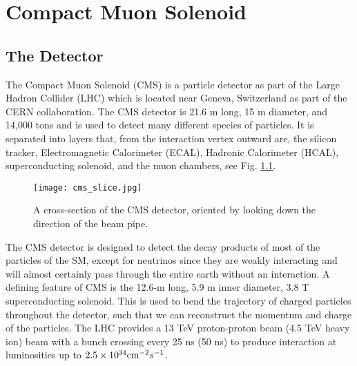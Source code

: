 \chapter{Compact Muon Solenoid}
\label{ch:CMS}

\section{The Detector}
\label{sec:cmsIntro}

The Compact Muon Solenoid (CMS) \cite{collaboration_cms_2008} is a particle detector as part of the Large Hadron Collider (LHC) \cite{evans_lhc_2008} which is located near Geneva, Switzerland as part of the CERN collaboration. The CMS detector is 21.6 m long, 15 m diameter, and 14,000 tons and is used to detect many different species of particles. It is separated into layers that, from the interaction vertex outward are, the silicon tracker, Electromagnetic Calorimeter (ECAL), Hadronic Calorimeter (HCAL), superconducting solenoid, and the muon chambers, see Fig. \ref{CMSSlice}. 

\begin{figure}
 	\centering
	\texttt{[image: cms\_slice.jpg]}
 	\caption[CMS Cross Section]{A cross-section of the CMS detector, oriented by looking down the direction of the beam pipe. }
 	\label{CMSSlice} 
\end{figure}

The CMS detector is designed to detect the decay products of most of the particles of the SM, except for neutrinos since they are weakly interacting and will almost certainly pass through the entire earth without an interaction. A defining feature of CMS is the 12.6-m long, 5.9 m inner diameter, 3.8 T superconducting solenoid. This is used to bend the trajectory of charged particles throughout the detector, such that we can reconstruct the momentum and charge of the particles. The LHC provides a 13 TeV proton-proton beam (4.5 TeV heavy ion) beam with a bunch crossing every 25 ns (50 ns) to produce interaction at luminosities up to $2.5\times10^{34} \text{cm}^{-2}s^{-1}$. 

